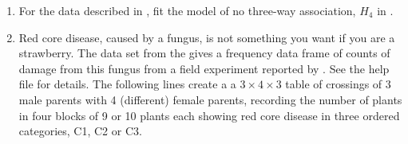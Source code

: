 \documentclass[11pt]{book}
\renewenvironment{knitrout}{\small\renewcommand{\baselinestretch}{.85}}{} %
\begin{document}
\begin{enumerate}
\item For the  data described in , fit the model of no three-way
association, $H_4$ in . 

\item Red core disease, caused by a fungus, is not something you want if you are a strawberry.
The data set  from the  gives a frequency data
frame of counts of damage from this fungus from a field experiment reported by
\cite{Jansen:1990}. See the help file for details.  The following lines create a
a $3 \times 4 \times 3$ table of crossings of 3 male parents with 4 (different)
female parents, recording the number of plants in four blocks of 9 or 10 plants
each showing red core disease in three ordered categories, C1, C2 or C3.
\begin{knitrout}
\color{fgcolor}\begin{kframe}
\begin{alltt}
\hlstd{(}\hlstd{,} \hlstd{=}\hlstd{)}

 \hlkwb{<-} 
 \hlkwb{<-}  \hlstd{=} \hlstd{=}\hlstd{(}\hlstd{,}\hlstd{,}\hlstd{)))}
\hlopt{$} \hlkwb{<-} \hlstd{(}\hlstd{,} \hlopt{:}\hlstd{)}
\hlopt{$} \hlkwb{<-} \hlstd{(}\hlstd{,} \hlopt{:}\hlstd{)}


\end{alltt}
\end{kframe}
\end{knitrout}
\end{enumerate}
\end{document}
